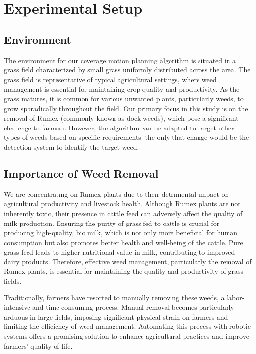 \chapter{Experimental Setup}

\section{Environment}
The environment for our coverage motion planning algorithm is situated in a grass field characterized by small grass uniformly distributed across the area. The grass field is representative of typical agricultural settings, where weed management is essential for maintaining crop quality and productivity. As the grass matures, it is common for various unwanted plants, particularly weeds, to grow sporadically throughout the field. Our primary focus in this study is on the removal of Rumex (commonly known as dock weeds), which pose a significant challenge to farmers. However, the algorithm can be adapted to target other types of weeds based on specific requirements, the only that change would be the detection system to identify the target weed.

\section{Importance of Weed Removal}

We are concentrating on Rumex plants due to their detrimental impact on agricultural productivity and livestock health. Although Rumex plants are not inherently toxic, their presence in cattle feed can adversely affect the quality of milk production. Ensuring the purity of grass fed to cattle is crucial for producing high-quality, bio milk, which is not only more beneficial for human consumption but also promotes better health and well-being of the cattle. Pure grass feed leads to higher nutritional value in milk, contributing to improved dairy products. Therefore, effective weed management, particularly the removal of Rumex plants, is essential for maintaining the quality and productivity of grass fields.


\vspace{3mm} 


Traditionally, farmers have resorted to manually removing these weeds, a labor-intensive and time-consuming process. Manual removal becomes particularly arduous in large fields, imposing significant physical strain on farmers and limiting the efficiency of weed management. Automating this process with robotic systems offers a promising solution to enhance agricultural practices and improve farmers' quality of life.


